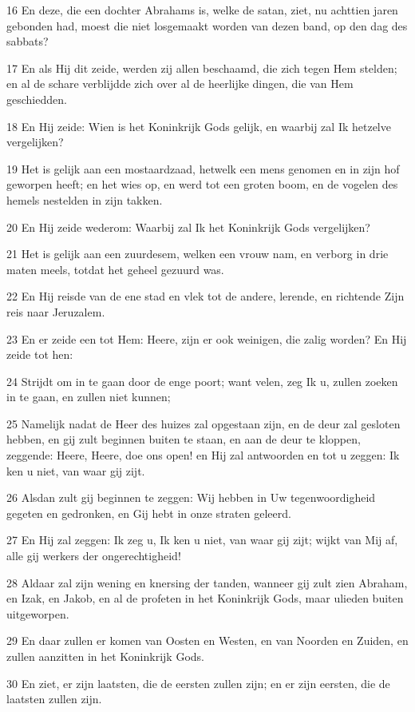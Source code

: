 \par 16 En deze, die een dochter Abrahams is, welke de satan, ziet, nu achttien jaren gebonden had, moest die niet losgemaakt worden van dezen band, op den dag des sabbats?
\par 17 En als Hij dit zeide, werden zij allen beschaamd, die zich tegen Hem stelden; en al de schare verblijdde zich over al de heerlijke dingen, die van Hem geschiedden.
\par 18 En Hij zeide: Wien is het Koninkrijk Gods gelijk, en waarbij zal Ik hetzelve vergelijken?
\par 19 Het is gelijk aan een mostaardzaad, hetwelk een mens genomen en in zijn hof geworpen heeft; en het wies op, en werd tot een groten boom, en de vogelen des hemels nestelden in zijn takken.
\par 20 En Hij zeide wederom: Waarbij zal Ik het Koninkrijk Gods vergelijken?
\par 21 Het is gelijk aan een zuurdesem, welken een vrouw nam, en verborg in drie maten meels, totdat het geheel gezuurd was.
\par 22 En Hij reisde van de ene stad en vlek tot de andere, lerende, en richtende Zijn reis naar Jeruzalem.
\par 23 En er zeide een tot Hem: Heere, zijn er ook weinigen, die zalig worden? En Hij zeide tot hen:
\par 24 Strijdt om in te gaan door de enge poort; want velen, zeg Ik u, zullen zoeken in te gaan, en zullen niet kunnen;
\par 25 Namelijk nadat de Heer des huizes zal opgestaan zijn, en de deur zal gesloten hebben, en gij zult beginnen buiten te staan, en aan de deur te kloppen, zeggende: Heere, Heere, doe ons open! en Hij zal antwoorden en tot u zeggen: Ik ken u niet, van waar gij zijt.
\par 26 Alsdan zult gij beginnen te zeggen: Wij hebben in Uw tegenwoordigheid gegeten en gedronken, en Gij hebt in onze straten geleerd.
\par 27 En Hij zal zeggen: Ik zeg u, Ik ken u niet, van waar gij zijt; wijkt van Mij af, alle gij werkers der ongerechtigheid!
\par 28 Aldaar zal zijn wening en knersing der tanden, wanneer gij zult zien Abraham, en Izak, en Jakob, en al de profeten in het Koninkrijk Gods, maar ulieden buiten uitgeworpen.
\par 29 En daar zullen er komen van Oosten en Westen, en van Noorden en Zuiden, en zullen aanzitten in het Koninkrijk Gods.
\par 30 En ziet, er zijn laatsten, die de eersten zullen zijn; en er zijn eersten, die de laatsten zullen zijn.
